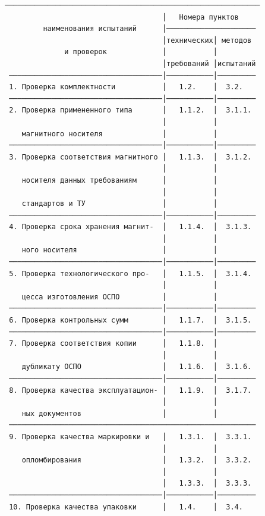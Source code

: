 \documentclass[11pt,a4paper]{article}
\begin{document}
\begin{center}\small
\begin{BVerbatim}
────────────────────────────────────────────────────────────
                                     │   Номера пунктов
         наименования испытаний      │─────────────────────
                                     │технических│ методов
              и проверок             │           │
                                     │требований │испытаний
 ────────────────────────────────────│───────────│─────────
 1. Проверка комплектности           │   1.2.    │  3.2.
 ────────────────────────────────────│───────────│─────────
 2. Проверка примененного типа       │   1.1.2.  │  3.1.1.
                                     │           │
    магнитного носителя              │           │
 ────────────────────────────────────│───────────│─────────
 3. Проверка соответствия магнитного │   1.1.3.  │  3.1.2.
                                     │           │
    носителя данных требованиям      │           │
                                     │           │
    стандартов и ТУ                  │           │
 ────────────────────────────────────│───────────│─────────
 4. Проверка срока хранения магнит-  │   1.1.4.  │  3.1.3.
                                     │           │
    ного носителя                    │           │
 ────────────────────────────────────│───────────│─────────
 5. Проверка технологического про-   │   1.1.5.  │  3.1.4.
                                     │           │
    цесса изготовления ОСПО          │           │
 ────────────────────────────────────│───────────│─────────
 6. Проверка контрольных сумм        │   1.1.7.  │  3.1.5.
 ────────────────────────────────────│───────────│─────────
 7. Проверка соответствия копии      │   1.1.8.  │
                                     │           │
    дубликату ОСПО                   │   1.1.6.  │  3.1.6.
 ────────────────────────────────────│───────────│─────────
 8. Проверка качества эксплуатацион- │   1.1.9.  │  3.1.7.
                                     │           │
    ных документов                   │           │
 ──────────────────────────────────────────────────────────
 9. Проверка качества маркировки и   │   1.3.1.  │  3.3.1.
                                     │           │
    опломбирования                   │   1.3.2.  │  3.3.2.
                                     │           │
                                     │   1.3.3.  │  3.3.3.
 ────────────────────────────────────│───────────│─────────
 10. Проверка качества упаковки      │   1.4.    │  3.4.
\end{BVerbatim}
\end{center}
\end{document}
